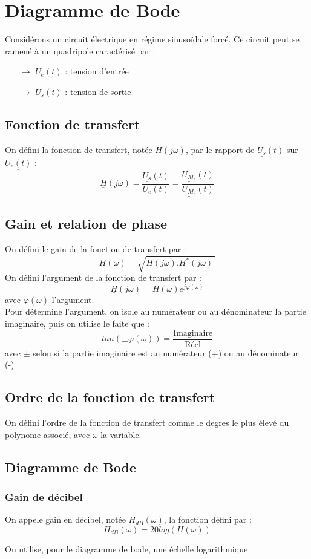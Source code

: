 \chapter{Diagramme de Bode}
Considérons un circuit électrique en régime sinusoïdale forcé. Ce circuit peut se ramené à un quadripole caractérisé par :
\begin{itemize}
 \item[$\rightarrow$] $U_e(t)$ : tension d'entrée
 \item[$\rightarrow$] $U_s(t)$ : tension de sortie
\end{itemize}
\section{Fonction de transfert}
\begin{de}
On défini la fonction de transfert, notée $\underline{H}(j\omega)$, par le rapport de $\underline{U_s}(t)$ sur $\underline{U_e(t)}$ :
$$\underline{H}(j\omega) = \dfrac{\underline{U_s}(t)}{\underline{U_e}(t)} = \dfrac{\underline{U_{M_s}}(t)}{\underline{U_{M_e}}(t)}$$
\end{de}
\section{Gain et relation de phase}
On défini le gain de la fonction de transfert par :
$$H(\omega) = \sqrt{\underline{H}(j\omega).\underline{H^*}(j\omega)\underline{}}$$
On défini l'argument de la fonction de transfert par :
$$\underline{H}(j\omega) = H(\omega)e^{j\varphi(\omega)}$$
avec $\varphi(\omega)$ l'argument.\\
Pour détermine l'argument, on isole au numérateur ou au dénominateur la partie imaginaire, puis on utilise le faite que :
$$tan(\pm\varphi(\omega))=\dfrac{\mbox{Imaginaire}}{\mbox{Réel}}$$
avec $\pm$ selon si la partie imaginaire est au numérateur (+) ou au dénominateur (-)
\section{Ordre de la fonction de transfert}
\begin{de}
 On défini l'ordre de la fonction de transfert comme le degres le plus élevé du polynome associé, avec $\omega$ la variable.
\end{de}
\section{Diagramme de Bode}
\subsection{Gain de décibel}
\begin{de}
On appele gain en décibel, notée $H_{dB}(\omega)$, la fonction défini par :
$$H_{dB}(\omega) = 20log(H(\omega))$$
\end{de}
On utilise, pour le diagramme de bode, une échelle logarithmique
